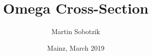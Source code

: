 \documentclass[
		10pt
		]{beamer}
\title[$\omega$ Cross-Section Studies] %
			{Omega Cross-Section} %
\subtitle{}
\date{Mainz, March 2019}
\author{Martin Sobotzik}
\institute[JGU Mainz]{
	Institute for Nuclear Physics\\ 
	Johannes Gutenberg University of Mainz\\ 
}
\begin{document}
\maketitle

\end{document}

